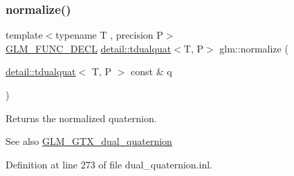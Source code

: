 \subsubsection{\texorpdfstring{normalize()}{normalize()}}
{\footnotesize\ttfamily template$<$typename T , precision P$>$ \\
\hyperlink{setup_8hpp_ab2d052de21a70539923e9bcbf6e83a51}{G\+L\+M\+\_\+\+F\+U\+N\+C\+\_\+\+D\+E\+CL} \hyperlink{structglm_1_1detail_1_1tdualquat}{detail\+::tdualquat}$<$T, P$>$ glm\+::normalize (\begin{DoxyParamCaption}\item[{\hyperlink{structglm_1_1detail_1_1tdualquat}{detail\+::tdualquat}$<$ T, P $>$ const \&}]{q }\end{DoxyParamCaption})}

Returns the normalized quaternion.

\begin{DoxySeeAlso}{See also}
\hyperlink{group__gtc__dual__quaternion}{G\+L\+M\+\_\+\+G\+T\+X\+\_\+dual\+\_\+quaternion} 
\end{DoxySeeAlso}


Definition at line 273 of file dual\+\_\+quaternion.\+inl.

